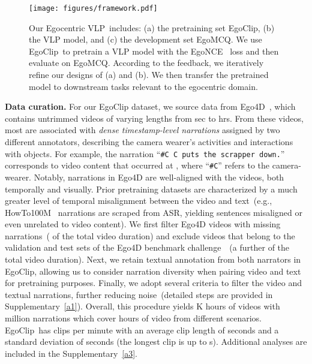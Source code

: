 \documentclass{article}
\newcommand{\vlp}{Egocentric VLP}
\newcommand{\dataset}{EgoClip}
\newcommand{\model}{EgoNCE\xspace}
\newcommand{\eval}{EgoMCQ}
\begin{document}
\begin{figure}[!t]
	\centering
	\vspace{-1.5em}
	\texttt{[image: figures/framework.pdf]}
	\vspace{-1.em}
	\caption{
	Our \vlp~includes: (a) the pretraining set \dataset, (b) the VLP model, and (c) the development set \eval. We use \dataset~to pretrain a VLP model with the \model~ loss and then evaluate on \eval. According to the feedback, we iteratively refine our designs of (a) and (b). We then transfer the pretrained model to downstream tasks relevant to the egocentric domain.}
	\vspace{-1.5em}
	\label{framework}
\end{figure}

\textbf{Data curation.}
For our \dataset{} dataset, we source data from Ego4D~\cite{grauman2021ego4d}, which contains  untrimmed videos of varying lengths from  sec to  hrs. From these videos, most are associated with \textit{dense timestamp-level narrations} assigned by two different annotators, describing the camera wearer's activities and interactions with objects. For example, the narration ``{\texttt{\#C C puts the scrapper down.}}'' corresponds to video content that occurred at {}, where  ``\texttt{\#C}'' refers to the camera-wearer.
Notably, narrations in Ego4D are well-aligned with the videos, both temporally and visually.
Prior pretraining datasets are characterized by a much greater level of temporal misalignment between the video and text~(e.g., HowTo100M~\cite{miech2019howto100m} narrations are scraped from ASR, yielding sentences misaligned or even unrelated to video content).
We first filter Ego4D videos with missing narrations~( of the total video duration) and exclude videos that belong to the validation and test sets of the Ego4D benchmark challenge~\cite{grauman2021ego4d}~(a further  of the total video duration). Next, we retain textual annotation from both narrators in \dataset, allowing us to consider narration diversity when pairing video and text for pretraining purposes. Finally, we adopt several criteria to filter the video and textual narrations, further reducing noise~(detailed steps are provided in Supplementary~\ref{a1}). Overall, this procedure yields K hours of videos with  million narrations which cover  hours of video from  different scenarios. \dataset~has  clips per minute with an average clip length of  seconds and a standard deviation of  seconds (the longest clip is up to s). Additional analyses are included in the Supplementary~\ref{a3}.
\end{document}
